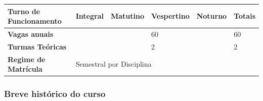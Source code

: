 \begin{table}[h]
\begin{tabular}{|l|l|l|l|l|l|}
\textbf{Turno de Funcionamento} & \textbf{Integral}                   & \textbf{Matutino}                   & \textbf{Vespertino} & \textbf{Noturno} & \textbf{Totais} \\ \hline
\textbf{Vagas anuais}           &                                     &                                     & 60                  &                  & 60              \\ \hline
\textbf{Turmas Teóricas}        &                                     &                                     & 2                   &                  & 2               \\ \hline
\textbf{Regime de Matrícula}    & \multicolumn{5}{l|}{Semestral por Disciplina}                                                                                        \\ \hline
\end{tabular}
\end{table}


\subsubsection{Breve histórico do curso}





